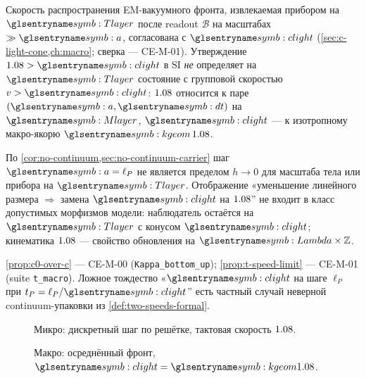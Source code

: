 \begin{proposition}
\label{prop:t-speed-limit}
Скорость распространения EM-вакуумного фронта, извлекаемая прибором на $\Tlayer$
после readout $\mathcal{B}$ на масштабах $\gg\caStepSpace$,
согласована с $\speedC$ (\cref{sec:c-light-cone,ch:macro}; сверка --- CE-M-01).
Утверждение $\caSignalSpeed>\speedC$ в SI \emph{не} определяет на $\Tlayer$
состояние с групповой скоростью $v>\speedC$:
$1.08$ относится к паре $(\caStepSpace,\htick)$ на $\Mlayer$,
$\speedC$ --- к изотропному макро-якорю $\caKappaGeom\,\caSignalSpeed$.
\end{proposition}

\begin{corollary}
\label{cor:no-m-kinematic-access}
По \cref{cor:no-continuum,sec:no-continuum-carrier} шаг $\caStepSpace=\ell_P$ не является
пределом $h\to 0$ для масштаба тела или прибора на $\Tlayer$.
Отображение «уменьшение линейного размера $\Rightarrow$ замена $\speedC$ на $1.08$''
не входит в класс допустимых морфизмов модели: наблюдатель остаётся на $\Tlayer$
с конусом $\speedC$; кинематика $1.08$ --- свойство обновления на $\carrierLattice\times\mathbb{Z}$.
\end{corollary}

\begin{remark}[Сверка]
\label{rem:two-c-burden}
\cref{prop:c0-over-c} --- CE-M-00 (\texttt{Kappa\_bottom\_up});
\cref{prop:t-speed-limit} --- CE-M-01 (suite \texttt{t\_macro}).
Ложное тождество «$\speedC$ на шаге $\ell_P$ при $t_P=\ell_P/\speedC$'' есть частный случай
неверной continuum-упаковки из \cref{def:two-speeds-formal}.
\end{remark}

\begin{figure}[htbp]
  \centering
  
  \caption{Микро: дискретный шаг по решётке, тактовая скорость $1.08$.}
  \label{fig:carrier-two-speeds-micro}
\end{figure}

\begin{figure}[htbp]
  \centering
  
  \caption{Макро: осреднённый фронт, $\speedC=\caKappaGeom \caSignalSpeed$.}
  \label{fig:carrier-two-speeds-macro}
\end{figure}

